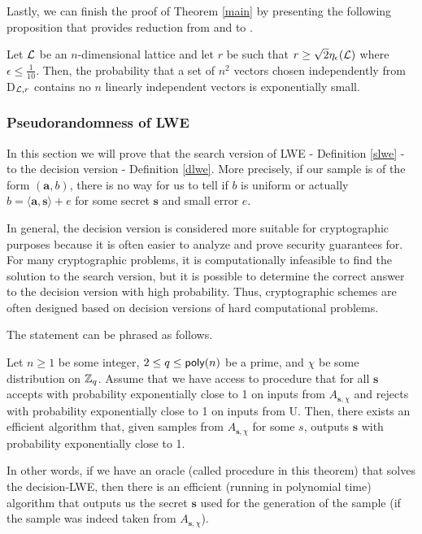 Lastly, we can finish the proof of Theorem \ref{main} by presenting the following proposition that provides reduction from  and  to .

\begin{proposition}
	Let $\mathcal{L}$ be an $n$-dimensional lattice and let $r$ be such that $r \geq \sqrt{2}\eta_{\epsilon}(\mathcal{L})$ where $\epsilon \leq \frac{1}{10}$. Then, the probability that a set of $n^2$ vectors chosen independently from D$_{\mathcal{L},r}$ contains no $n$ linearly independent vectors is exponentially small.
\end{proposition}

\subsubsection{Pseudorandomness of LWE}
In this section we will prove that the search version of LWE - Definition \ref{slwe} - to the decision version - Definition \ref{dlwe}. More precisely, if our sample is of the form $(\bm{a}, b)$, there is no way for us to tell if $b$ is uniform or actually $b = \langle \bm{a}, \bm{s} \rangle + e$ for some secret $\bm{s}$ and small error $e$.

In general, the decision version is considered more suitable for cryptographic purposes because it is often easier to analyze and prove security guarantees for. For many cryptographic problems, it is computationally infeasible to find the solution to the search version, but it is possible to determine the correct answer to the decision version with high probability. Thus, cryptographic schemes are often designed based on decision versions of hard computational problems.

The statement can be phrased as follows.
\begin{theorem}\label{s-to-d}
	Let $n \geq 1$ be some integer, $2 \leq q\leq \alg{poly}(n)$ be a prime, and $\chi$ be some distribution on $\mathbb{Z}_q$. Assume that we have access to procedure  that for all $\bm{s}$ accepts with probability exponentially close to 1 on inputs from $A_{\bm{s},\chi}$ and rejects with probability exponentially close to 1 on inputs from U. Then, there exists an efficient algorithm  that, given samples from $A_{\bm{s},\chi}$ for some $s$, outputs $\bm{s}$ with probability exponentially close to 1.
\end{theorem}

In other words, if we have an oracle (called procedure in this theorem) that solves the decision-LWE, then there is an efficient (running in polynomial time) algorithm that outputs us the secret $\bm{s}$ used for the generation of the sample (if the sample was indeed taken from $A_{\bm{s}, \chi}$).

